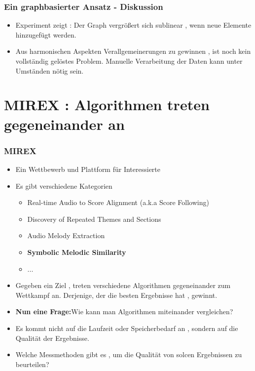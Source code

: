 \documentclass{beamer}
\begin{document}
	\begin{frame}
		\frametitle{Ein graphbasierter Ansatz - Diskussion}
		\begin{itemize}
				\item Experiment zeigt : Der Graph vergrößert sich sublinear , wenn neue Elemente hinzugefügt werden.
				\item Aus harmonischen Aspekten Verallgemeinerungen zu gewinnen , ist noch kein vollständig gelöstes Problem. Manuelle Verarbeitung der Daten kann unter Umständen nötig sein.
		\end{itemize}
	\end{frame}





	\section{MIREX : Algorithmen treten gegeneinander an}

	\begin{frame}
		\frametitle{MIREX}
		\begin{itemize}
			\item Ein Wettbewerb und Plattform für Interessierte
			\item Es gibt verschiedene Kategorien
				\begin{itemize}
					\item Real-time Audio to Score Alignment (a.k.a Score Following)
					\item Discovery of Repeated Themes and Sections
					\item Audio Melody Extraction
					\item \textbf{Symbolic Melodic Similarity}
					\item ...
				\end{itemize}
			\item Gegeben ein Ziel , treten verschiedene Algorithmen gegeneinander zum Wettkampf an. Derjenige, der die besten Ergebnisse hat , gewinnt. 
			\item \textbf{Nun eine Frage:}Wie kann man Algorithmen miteinander vergleichen?
			\item Es kommt nicht auf die Laufzeit oder Speicherbedarf an , sondern auf die Qualität der Ergebnisse.
			\item Welche Messmethoden gibt es , um die Qualität von solcen Ergebnissen zu beurteilen?
		\end{itemize}
	\end{frame}
\end{document}
